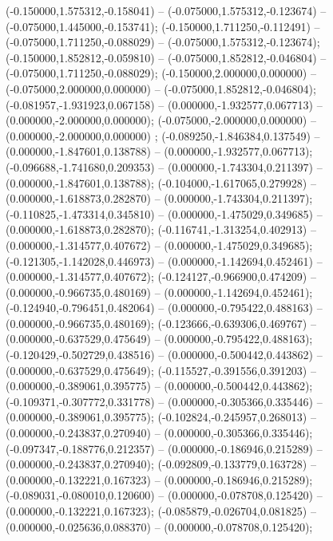  (-0.150000,1.575312,-0.158041) -- (-0.075000,1.575312,-0.123674) -- (-0.075000,1.445000,-0.153741);
 (-0.150000,1.711250,-0.112491) -- (-0.075000,1.711250,-0.088029) -- (-0.075000,1.575312,-0.123674);
 (-0.150000,1.852812,-0.059810) -- (-0.075000,1.852812,-0.046804) -- (-0.075000,1.711250,-0.088029);
 (-0.150000,2.000000,0.000000) -- (-0.075000,2.000000,0.000000) -- (-0.075000,1.852812,-0.046804);
 (-0.081957,-1.931923,0.067158) -- (0.000000,-1.932577,0.067713) -- (0.000000,-2.000000,0.000000);
 (-0.075000,-2.000000,0.000000) -- (0.000000,-2.000000,0.000000) ;
 (-0.089250,-1.846384,0.137549) -- (0.000000,-1.847601,0.138788) -- (0.000000,-1.932577,0.067713);
 (-0.096688,-1.741680,0.209353) -- (0.000000,-1.743304,0.211397) -- (0.000000,-1.847601,0.138788);
 (-0.104000,-1.617065,0.279928) -- (0.000000,-1.618873,0.282870) -- (0.000000,-1.743304,0.211397);
 (-0.110825,-1.473314,0.345810) -- (0.000000,-1.475029,0.349685) -- (0.000000,-1.618873,0.282870);
 (-0.116741,-1.313254,0.402913) -- (0.000000,-1.314577,0.407672) -- (0.000000,-1.475029,0.349685);
 (-0.121305,-1.142028,0.446973) -- (0.000000,-1.142694,0.452461) -- (0.000000,-1.314577,0.407672);
 (-0.124127,-0.966900,0.474209) -- (0.000000,-0.966735,0.480169) -- (0.000000,-1.142694,0.452461);
 (-0.124940,-0.796451,0.482064) -- (0.000000,-0.795422,0.488163) -- (0.000000,-0.966735,0.480169);
 (-0.123666,-0.639306,0.469767) -- (0.000000,-0.637529,0.475649) -- (0.000000,-0.795422,0.488163);
 (-0.120429,-0.502729,0.438516) -- (0.000000,-0.500442,0.443862) -- (0.000000,-0.637529,0.475649);
 (-0.115527,-0.391556,0.391203) -- (0.000000,-0.389061,0.395775) -- (0.000000,-0.500442,0.443862);
 (-0.109371,-0.307772,0.331778) -- (0.000000,-0.305366,0.335446) -- (0.000000,-0.389061,0.395775);
 (-0.102824,-0.245957,0.268013) -- (0.000000,-0.243837,0.270940) -- (0.000000,-0.305366,0.335446);
 (-0.097347,-0.188776,0.212357) -- (0.000000,-0.186946,0.215289) -- (0.000000,-0.243837,0.270940);
 (-0.092809,-0.133779,0.163728) -- (0.000000,-0.132221,0.167323) -- (0.000000,-0.186946,0.215289);
 (-0.089031,-0.080010,0.120600) -- (0.000000,-0.078708,0.125420) -- (0.000000,-0.132221,0.167323);
 (-0.085879,-0.026704,0.081825) -- (0.000000,-0.025636,0.088370) -- (0.000000,-0.078708,0.125420);
